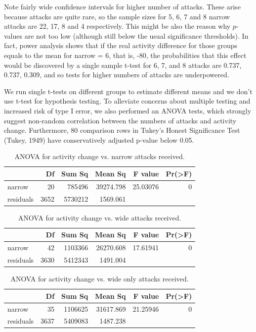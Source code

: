 \documentclass[10pt,]{scrartcl}
\begin{document}
Note fairly wide confidence intervals for higher number of attacks.
These arise because attacks are quite rare, so the sample sizes for 5,
6, 7 and 8 narrow attacks are 22, 17, 8 and 4 respectively. This might
be also the reason why \(p\)-values are not too low (although still
below the usual significance thresholds). In fact, power analysis shows
that if the real activity difference for those groups equals to the mean
for \textsf{narrow = 6}, that is, -80, the probabilities that this
effect would be discovered by a single sample t-test for 6, 7, and 8
attacks are 0.737, 0.737, 0.309, and so tests for higher numbers of
attacks are underpowered.

We run single t-tests on different groups to estimate different means
and we don't use t-test for hypothesis testing. To alleviate concerns
about multiple testing and increased risk of type I error, we also
performed an ANOVA tests, which strongly suggest non-random correlation
between the numbers of attacks and activity change. Furthermore, 80
comparison rows in Tukey's Honest Significance Test (Tukey, 1949) have
conservatively adjusted p-value below 0.05.

\begin{table}[h!]

\begin{tabular}{l|r|r|r|r|r}
\hline
  & Df & Sum Sq & Mean Sq & F value & Pr(>F)\\
\hline
narrow & 20 & 785496 & 39274.798 & 25.03076 & 0\\
\hline
residuals & 3652 & 5730212 & 1569.061 &  & \\
\hline
\end{tabular}
\caption{ANOVA for activity change vs. narrow attacks received.}
\label{tab:anovanarrow}
\end{table}

\begin{table}[h!]

\begin{tabular}{l|r|r|r|r|r}
\hline
  & Df & Sum Sq & Mean Sq & F value & Pr(>F)\\
\hline
narrow & 42 & 1103366 & 26270.608 & 17.61941 & 0\\
\hline
residuals & 3630 & 5412343 & 1491.004 &  & \\
\hline
\end{tabular}
\caption{ANOVA for activity change vs. wide attacks received.}
\label{tab:anovawide}
\end{table}

\begin{table}[h!]

\begin{tabular}{l|r|r|r|r|r}
\hline
  & Df & Sum Sq & Mean Sq & F value & Pr(>F)\\
\hline
narrow & 35 & 1106625 & 31617.869 & 21.25946 & 0\\
\hline
residuals & 3637 & 5409083 & 1487.238 &  & \\
\hline
\end{tabular}
\caption{ANOVA for activity change vs. wide only attacks received.}
\label{tab:anovawideonly}
\end{table}
\end{document}
